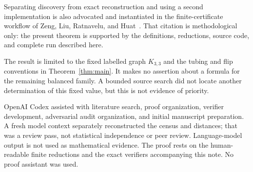 \documentclass[11pt]{article}
\begin{document}
Separating discovery from exact reconstruction and using a second
implementation is also advocated and instantiated in the finite-certificate
workflow of Zeng, Liu, Ratnavelu, and Huat~\cite{ZengEtAl2026Certificates}.
That citation is methodological only: the present theorem is supported by the
definitions, reductions, source code, and complete run described here.

The result is limited to the fixed labelled graph \(K_{3,3}\) and the tubing
and flip conventions in Theorem~\ref{thm:main}.  It makes no assertion about a
formula for the remaining balanced family.  A bounded source search did not
locate another determination of this fixed value, but this is not evidence of
priority.

OpenAI Codex assisted with literature search, proof organization, verifier
development, adversarial audit organization, and initial manuscript
preparation.  A fresh model context separately reconstructed the census and
distances; that was a review pass, not statistical independence or peer
review.  Language-model output is not used as mathematical evidence.  The
proof rests on the human-readable finite reductions and the exact verifiers
accompanying this note.  No proof assistant was used.



\end{document}
